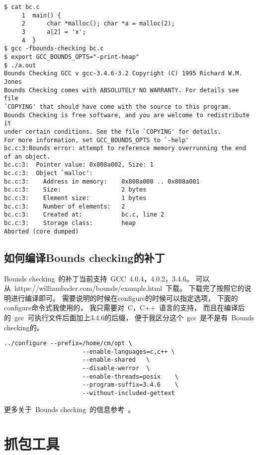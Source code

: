 \begin{lstlisting}
$ cat bc.c
     1  main() {
     2      char *malloc(); char *a = malloc(2);
     3      a[2] = 'x';
     4  }
$ gcc -fbounds-checking bc.c
$ export GCC_BOUNDS_OPTS="-print-heap"
$ ./a.out
Bounds Checking GCC v gcc-3.4.6-3.2 Copyright (C) 1995 Richard W.M. Jones
Bounds Checking comes with ABSOLUTELY NO WARRANTY. For details see file
`COPYING' that should have come with the source to this program.
Bounds Checking is free software, and you are welcome to redistribute it
under certain conditions. See the file `COPYING' for details.
For more information, set GCC_BOUNDS_OPTS to `-help'
bc.c:3:Bounds error: attempt to reference memory overrunning the end of an object.
bc.c:3:  Pointer value: 0x808a002, Size: 1
bc.c:3:  Object `malloc':
bc.c:3:    Address in memory:    0x808a000 .. 0x808a001
bc.c:3:    Size:                 2 bytes
bc.c:3:    Element size:         1 bytes
bc.c:3:    Number of elements:   2
bc.c:3:    Created at:           bc.c, line 2
bc.c:3:    Storage class:        heap
Aborted (core dumped)
\end{lstlisting}


\subsection{如何编译Bounds checking的补丁}

Bounds checking~的补丁当前支持~GCC~4.0.4，4.0.2，3.4.6。
可以从~https://williambader.com/bounds/example.html~下载。
下载完了按照它的说明进行编译即可。
需要说明的时候在configure的时候可以指定选项，
下面的configure命令式我使用的，
我只需要对~C，C++~语言的支持，
而且在编译后的~gcc~可执行文件后面加上3.4.6的后缀，
便于我区分这个~gcc~是不是有~Bounds checking的。

\begin{lstlisting}
../configure --prefix=/home/cm/opt \
                      --enable-languages=c,c++ \
                      --enable-shared   \
                      --disable-werror  \
                      --enable-threads=posix    \
                      --program-suffix=3.4.6    \
                      --without-included-gettext
\end{lstlisting}

更多关于~Bounds checking~的信息参考~\cite{bounds-checking-example}。


\section{抓包工具}

